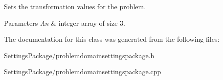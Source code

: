 Sets the transformation values for the problem. 


\begin{DoxyParams}{Parameters}
{\em An} & integer array of size 3. \\
\hline
\end{DoxyParams}


The documentation for this class was generated from the following files\+:\begin{DoxyCompactItemize}
\item 
Settings\+Package/problemdomainsettingspackage.\+h\item 
Settings\+Package/problemdomainsettingspackage.\+cpp\end{DoxyCompactItemize}
